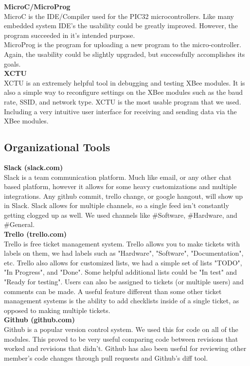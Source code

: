 \documentclass[paper=a4, fontsize=11pt]{scrartcl}
\numberwithin{equation}{section}		%
\numberwithin{figure}{section}			%
\numberwithin{table}{section}				%
\begin{document}
\textbf{MicroC/MicroProg}\\
MicroC is the IDE/Compiler used for the PIC32 microcontrollers. Like many embedded system IDE's the usability could be greatly improved. However, the program succeeded in it's intended purpose.\\
MicroProg is the program for uploading a new program to the micro-controller. Again, the usability could be slightly upgraded, but successfully accomplishes its goals.\\

\textbf{XCTU}\\
XCTU is an extremely helpful tool in debugging and testing XBee modules. It is also a simple way to reconfigure settings on the XBee modules such as the baud rate, SSID, and network type. XCTU is the most usable program that we used. Including a very intuitive user interface for receiving and sending data via the XBee modules.\\

\subsection{Organizational Tools}
\textbf{Slack (slack.com)}\\
Slack is a team communication platform. Much like email, or any other chat based platform, however it allows for some heavy customizations and multiple integrations. Any github commit, trello change, or google hangout, will show up in Slack. Slack allows for multiple channels, so a single feed isn't constantly getting clogged up as well. We used channels like \#Software, \#Hardware, and \#General.\\

\textbf{Trello (trello.com)}\\
Trello is free ticket management system. Trello allows you to make tickets with labels on them, we had labels such as "Hardware", "Software", "Documentation", etc. Trello also allows for customized lists, we had a simple set of lists "TODO", "In Progress", and "Done". Some helpful additional lists could be "In test" and "Ready for testing".  Users can also be assigned to tickets (or multiple users) and comments can be made. A useful feature different than some other ticket management systems is the ability to add checklists inside of a single ticket, as opposed to making multiple tickets.\\

\textbf{Github (github.com)}\\
Github is a popular version control system. We used this for code on all of the modules. This proved to be very useful comparing code between revisions that worked and revisions that didn't. Github has also been useful for reviewing other member's code changes through pull requests and Github's diff tool.\\
\end{document}
